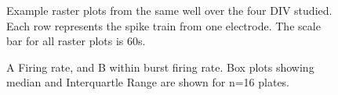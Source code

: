 \documentclass{article}
\begin{document}
\pagestyle{empty}


\makeatletter
\@fpsep\textheight
\makeatother

\begin{figure}
  \centering
  \caption{Example raster plots from the same well over the four DIV
studied. Each row represents the spike train from one electrode. The
scale bar for all raster plots is 60s.}
\end{figure}

\begin{figure}
  \centering
  \caption{A Firing rate, and B within burst firing rate.  Box plots
    showing median and Interquartle Range are shown for n=16 plates.}
\end{figure}
\end{document}
